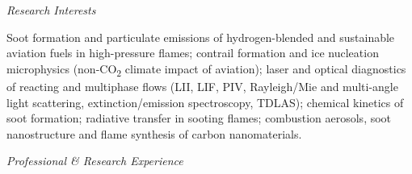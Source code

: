 \documentclass[11pt,a4paper]{article}
\begin{document}
	\begin{sectionbanner}{\emph{Research Interests}}
	\end{sectionbanner}
	\noindent Soot formation and particulate emissions of hydrogen-blended and sustainable aviation fuels in high-pressure flames; contrail formation and ice nucleation microphysics (non-CO\textsubscript{2} climate impact of aviation); laser and optical diagnostics of reacting and multiphase flows (LII, LIF, PIV, Rayleigh/Mie and multi-angle light scattering, extinction/emission spectroscopy, TDLAS); chemical kinetics of soot formation; radiative transfer in sooting flames; combustion aerosols, soot nanostructure and flame synthesis of carbon nanomaterials.
	
	\begin{sectionbanner}{\emph{Professional \& Research Experience}}
	\end{sectionbanner}
	
\end{document}
